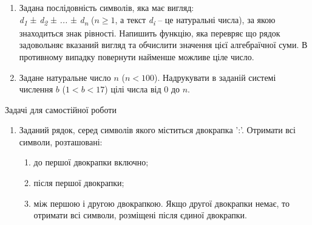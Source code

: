 \documentclass[]{article}
\makeatletter
\newcommand{\xslalph}[1]{\expandafter\@xslalph\csname c@#1\endcsname}
\newcommand{\@xslalph}[1]{%
    \ifcase#1\or а\or б\or в\or г\or д\or e\or є\or ж\or з\or i%
    \or й\or к\or л\or м\or н\or о\or п\or р\or с\or т%
    \or у\or ф\or х\or ц\or ч\or ш\or ю\or я\or аа\or бб\or вв%
    \else\@ctrerr\fi%
}
\makeatother
\begin{document}
\begin{enumerate}
\begin{enumerate}[label=\xslalph*)]
\begin{enumerate}
\begin{enumerate}[label=\xslalph*)]
\begin{enumerate}
\item
Задана послідовність символів, яка має вигляд:\\
\emph{d\textsubscript{1}} ± \emph{d\textsubscript{2}} ± \emph{...} ±
\emph{d\textsubscript{n }} ($n \ge 1 $, а текст \emph{d\textsubscript{i }} -- це натуральні
числа), за якою знаходиться знак рівності.
Напишить функцію, яка перевряє що рядок задовольняє вказаний вигляд та обчислити значення
цієї алгебраїчної суми. В противному випадку повернути найменше можливе ціле число.

\item
Задане натуральне число $n$ ($n<100$). Надрукувати в заданій системі числення $b$ ($1<b<17$)
цілі числа від 0 до $n$.
\end{enumerate}

Задачі для самостійної роботи

\begin{enumerate}
\def\labelenumi{\arabic{enumi})}
\setcounter{enumi}{5}
\item Заданий рядок, серед символів якого міститься двокрапка ':'.
 Отримати всі символи, розташовані:
\begin{enumerate}[label=\xslalph*)]
\item до першої двокрапки включно;
\item після першої двокрапки;
\item між першою і другою двокрапкою. Якщо другої двокрапки немає, 
то отримати всі символи, розміщені після єдиної двокрапки.
\end{enumerate}


\end{enumerate}
\end{enumerate}
\end{enumerate}
\end{enumerate}
\end{enumerate}
\end{document}
